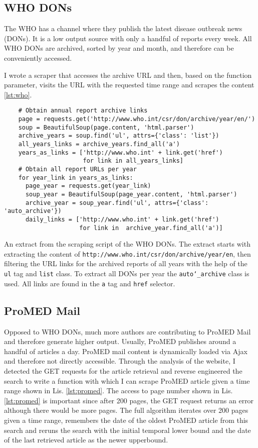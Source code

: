\subsection{WHO DONs}
The WHO has a channel where they publish the latest disease outbreak news (DONs).
It is a low output source with only a handful of reports every week.
All WHO DONs are archived, sorted by year and month, and therefore can be conveniently accessed.

I wrote a scraper that accesses the archive URL and then, based on the function parameter, visits the URL with the requested time range and scrapes the content \ref{lst:who}.

\begin{listing}[h]
  \begin{verbatim}
    # Obtain annual report archive links
    page = requests.get('http://www.who.int/csr/don/archive/year/en/')
    soup = BeautifulSoup(page.content, 'html.parser')
    archive_years = soup.find('ul', attrs={'class': 'list'})
    all_years_links = archive_years.find_all('a')
    years_as_links = ['http://www.who.int' + link.get('href')
                      for link in all_years_links]
    # Obtain all report URLs per year
    for year_link in years_as_links:
      page_year = requests.get(year_link)
      soup_year = BeautifulSoup(page_year.content, 'html.parser')
      archive_year = soup_year.find('ul', attrs={'class': 'auto_archive'})
      daily_links = ['http://www.who.int' + link.get('href')
                     for link in  archive_year.find_all('a')]
  \end{verbatim}
  \caption{An extract from the scraping script of the WHO DONs. The extract starts with extracting the content of \textquotesingle \texttt{http://www.who.int/csr/don/archive/year/en}\textquotesingle, then filtering the URL links for the archived reports of all years with the help of the \texttt{ul} tag and \texttt{list} class. To extract all DONs per year the \texttt{auto\char`_archive} class is used. All links are found in the \texttt{a} tag and \texttt{href} selector.}
  \label{lst:who}
\end{listing}

\subsection{ProMED Mail}
Opposed to WHO DONs, much more authors are contributing to ProMED Mail and therefore generate higher output. Usually, ProMED publishes around a handful of articles a day. ProMED mail content is dynamically loaded via Ajax and therefore not directly accessible. Through the analysis of the website, I detected the GET requests for the article retrieval and reverse engineered the search to write a function with which I can scrape ProMED article given a time range shown in Lis. \ref{lst:promed}. The access to page number shown in Lis. \ref{lst:promed} is important since after 200 pages, the GET request returns an error although there would be more pages. The full algorithm iterates over 200 pages given a time range, remembers the date of the oldest ProMED article from this search and reruns the search with the initial temporal lower bound and the date of the last retrieved article as the newer upperbound.

